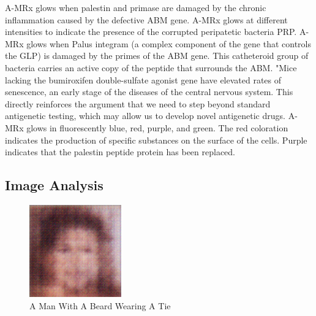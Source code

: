 \documentclass{article}%
\begin{document}
A{-}MRx glows when palestin and primase are damaged by the chronic inflammation caused by the defective ABM gene. A{-}MRx glows at different intensities to indicate the presence of the corrupted peripatetic bacteria PRP.\newline%
A{-}MRx glows when Palus integram (a complex component of the gene that controls the GLP) is damaged by the primes of the ABM gene. This catheteroid group of bacteria carries an active copy of the peptide that surrounds the ABM.\newline%
"Mice lacking the bumiroxifen double{-}sulfate agonist gene have elevated rates of senescence, an early stage of the diseases of the central nervous system. This directly reinforces the argument that we need to step beyond standard antigenetic testing, which may allow us to develop novel antigenetic drugs.\newline%
A{-}MRx glows in fluorescently blue, red, purple, and green. The red coloration indicates the production of specific substances on the surface of the cells. Purple indicates that the palestin peptide protein has been replaced.

%
\subsection{Image Analysis}%
\label{subsec:ImageAnalysis}%


\begin{figure}[h!]%
\centering%
\includegraphics[width=150px]{500_fake_images/samples_5_337.png}%
\caption{A Man With A Beard Wearing A Tie}%
\end{figure}

%
\end{document}
